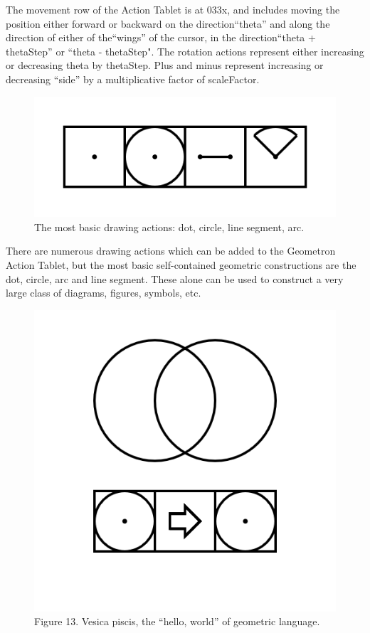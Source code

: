 \documentclass[11pt]{article}
\begin{document}
    The movement row of the Action Tablet is at 033x, and includes moving the position either forward or backward on the direction``theta'' and along the direction of either of the``wings'' of the cursor, in the direction``theta + thetaStep'' or ``theta - thetaStep".  The rotation actions represent either increasing or decreasing theta by thetaStep.  Plus and minus represent increasing or decreasing ``side'' by a multiplicative factor of scaleFactor.  


\begin{figure}

\includegraphics[width=\linewidth]{figures/figure12_basicDraw.png}

\caption{The most basic drawing actions: dot, circle, line segment, arc.}
\end{figure}

    There are numerous drawing actions which can be added to the Geometron Action Tablet, but the most basic self-contained geometric constructions are the dot, circle, arc and line segment.  These alone can be used to construct a very large class of diagrams, figures, symbols, etc.  

\begin{figure}

\includegraphics[width=\linewidth]{figures/figure13_vesicaPisces.png}

\caption{Figure 13. Vesica piscis, the ``hello, world'' of geometric language.}
\end{figure}
\end{document}
